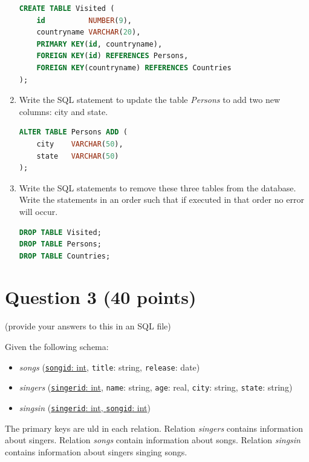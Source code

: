 \documentclass[letterpaper, 11pt]{article}
\begin{document}
\begin{enumerate}[label={\alph*}),leftmargin=*]
\begin{tcolorbox}
\begin{lstlisting}[language=SQL]
CREATE TABLE Visited (
    id          NUMBER(9),
    countryname VARCHAR(20),
    PRIMARY KEY(id, countryname),
    FOREIGN KEY(id) REFERENCES Persons,
    FOREIGN KEY(countryname) REFERENCES Countries
);
    \end{lstlisting}
    \end{tcolorbox}
    
    \item Write the SQL statement to update the table \textit{Persons} to add two new columns: city and state.
    \begin{tcolorbox}
    \begin{lstlisting}[language=SQL]
ALTER TABLE Persons ADD (
    city    VARCHAR(50),
    state   VARCHAR(50)
);
    \end{lstlisting}   
    \end{tcolorbox}
    
    
    \item Write the SQL statements to remove these three tables from the database. Write the statements in an order such that if executed in that order no error will occur.
    \begin{tcolorbox}
    \begin{lstlisting}[language=SQL]
DROP TABLE Visited;
DROP TABLE Persons;
DROP TABLE Countries;
    \end{lstlisting}
    \end{tcolorbox}
    
\end{enumerate}

\section*{Question 3 (40 points)}

(provide your answers to this in an SQL file)

Given the following schema:
\begin{itemize}
    \item \textit{songs} (\ul{\texttt{songid}: int}, \texttt{title}: string, \texttt{release}: date)
    \item \textit{singers} (\ul{\texttt{singerid}: int}, \texttt{name}: string, \texttt{age}: real, \texttt{city}: string, \texttt{state}: string)
    \item \textit{singsin} (\ul{\texttt{singerid}: int, \texttt{songid}: int})
\end{itemize}

The primary keys are uld in each relation. Relation \textit{singers} contains information about singers. Relation \textit{songs} contain information about songs. Relation \textit{singsin} contains information about singers singing songs.
\end{document}
